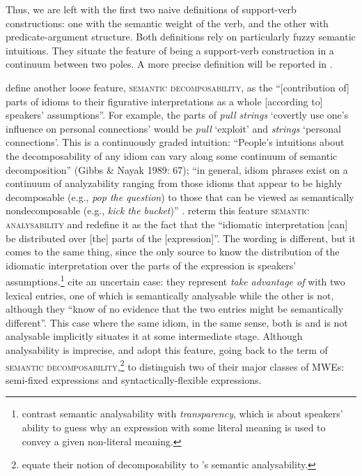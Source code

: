 \documentclass[output=paper]{langsci/langscibook}
\begin{document}
\largerpage
Thus, we are left with the first two naive definitions of support-verb constructions: one with the semantic weight of the verb, and the other with predicate-argument structure. Both definitions rely on particularly fuzzy semantic intuitions. They situate the feature of being a support-verb construction in a continuum between two poles. A more precise definition will be reported in .

\citet[104]{Gibbs1989} 
define another loose feature, \textsc{semantic decomposability}, as the “[contribution of] parts of idioms to their figurative interpretations as a whole [according to] speakers’ assumptions”. For example, the parts of \textit{pull strings} ‘covertly use one’s influence on personal connections’ would be \textit{pull} ‘exploit’ and \textit{strings} ‘personal connections’. This is a continuously graded intuition: “People’s intuitions about the decomposability of any idiom can vary along some continuum of semantic decomposition” 
(Gibbs \& Nayak 1989: 67); “in general, idiom phrases exist on a continuum of analyzability ranging from those idioms that appear to be highly decomposable (e.g., \textit{pop the question}) to those that can be viewed as semantically nondecomposable (e.g., \textit{kick the bucket})” \citep[107]{Gibbs1989}. \cite[497, 508]{Nunberg1994} reterm this feature \textsc{semantic analysability} and redefine it as the fact that the “idiomatic interpretation [can] be distributed over [the] parts of the [expression]”. The wording is different, but it comes to the same thing, since the only source to know the distribution of the idiomatic interpretation over the parts of the expression is speakers’ assumptions.\footnote{\cite[496--497]{Nunberg1994}  contrast semantic analysability with \textit{transparency}, which is about speakers’ ability to guess why an expression with some literal meaning is used to convey a given non-literal meaning.} \cite[520--523]{Nunberg1994} cite an uncertain case: they represent \textit{take advantage of} with two lexical entries, one of which is semantically analysable while the other is not, although they “know of no evidence that the two entries might be semantically different”. This case where the same idiom, in the same sense, both is and is not analysable implicitly situates it at some intermediate stage. Although analysability is imprecise, \citet{Sag:2002}  and \cite[270]{Baldwin2010} adopt this feature, going back to the term of \textsc{semantic decomposability},\footnote{\cite[270]{Baldwin2010} equate their notion of decomposability to \citet[496]{Nunberg1994}’s  semantic analysability.} to distinguish two of their major classes of MWEs: semi-fixed expressions and syntactically-flexible expressions. 
\end{document}
